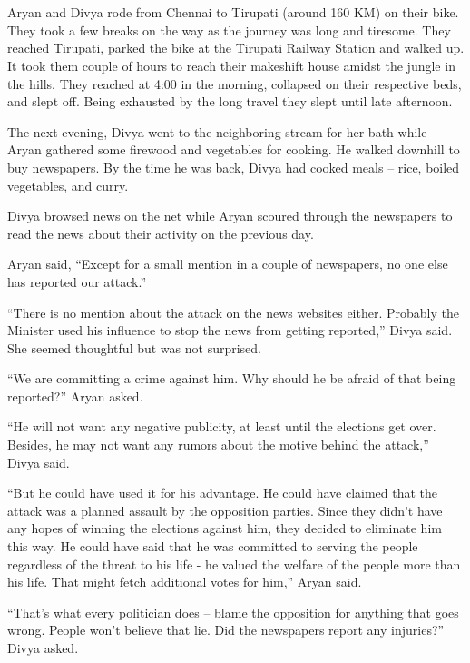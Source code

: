 \chapter{}
Aryan and Divya rode from Chennai to Tirupati (around 160 KM) on their bike.
They took a few breaks on the way as the journey was long and tiresome. They
reached Tirupati, parked the bike at the Tirupati Railway Station and walked up.
It took them couple of hours to reach their makeshift house amidst the jungle in
the hills. They reached at 4:00 in the morning, collapsed on their respective
beds, and slept off. Being exhausted by the long travel they slept until late
afternoon.

The next evening, Divya went to the neighboring stream for her bath while Aryan
gathered some firewood and vegetables for cooking. He walked downhill to buy
newspapers. By the time he was back, Divya had cooked meals – rice, boiled
vegetables, and curry.

Divya browsed news on the net while Aryan scoured through the newspapers to read
the news about their activity on the previous day.

Aryan said, “Except for a small mention in a couple of newspapers, no one else
has reported our attack.”

“There is no mention about the attack on the news websites either. Probably the
Minister used his influence to stop the news from getting reported,” Divya said.
She seemed thoughtful but was not surprised.

“We are committing a crime against him. Why should he be afraid of that being
reported?” Aryan asked.

“He will not want any negative publicity, at least until the elections get over.
Besides, he may not want any rumors about the motive behind the attack,” Divya
said.

“But he could have used it for his advantage. He could have claimed that the
attack was a planned assault by the opposition parties. Since they didn't have
any hopes of winning the elections against him, they decided to eliminate him
this way. He could have said that he was committed to serving the people
regardless of the threat to his life - he valued the welfare of the people more
than his life. That might fetch additional votes for him,” Aryan said.

“That's what every politician does – blame the opposition for anything that goes
wrong. People won't believe that lie. Did the newspapers report any injuries?”
Divya asked.

